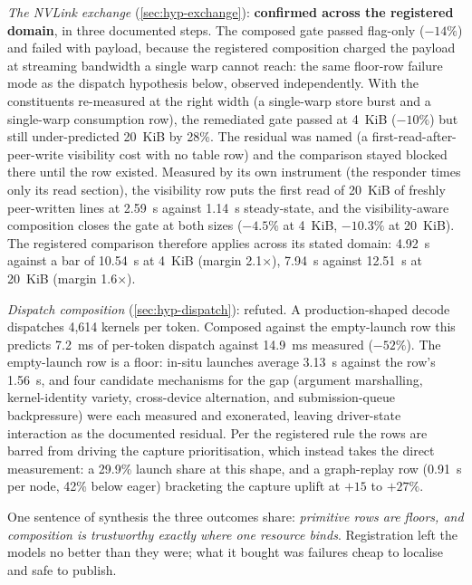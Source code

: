 \emph{The NVLink exchange} (\cref{sec:hyp-exchange}): \textbf{confirmed
across the registered domain}, in three documented steps. The composed
gate passed flag-only ($-14\%$) and failed with payload, because the
registered composition charged the payload at streaming bandwidth a
single warp cannot reach: the same floor-row failure mode as the
dispatch hypothesis below, observed independently. With the constituents
re-measured at the right width (a single-warp store burst and a
single-warp consumption row), the remediated gate passed at 4~KiB
($-10\%$) but still under-predicted 20~KiB by 28\%. The residual was
named (a first-read-after-peer-write visibility cost with no table
row) and the comparison stayed blocked there until the row existed.
Measured by its own instrument (the responder times only its read
section), the visibility row puts the first read of 20~KiB of freshly
peer-written lines at 2.59~\textmu s against 1.14~\textmu s
steady-state, and the
visibility-aware composition closes the gate at both sizes ($-4.5\%$ at
4~KiB, $-10.3\%$ at 20~KiB). The registered comparison therefore applies
across its stated domain: 4.92~\textmu s against a bar of
10.54~\textmu s at 4~KiB (margin 2.1$\times$), 7.94~\textmu s against
12.51~\textmu s at 20~KiB (margin 1.6$\times$).

\emph{Dispatch composition} (\cref{sec:hyp-dispatch}): refuted. A
production-shaped decode dispatches 4{,}614 kernels per token. Composed
against the empty-launch row this predicts 7.2~ms of per-token dispatch
against 14.9~ms measured ($-52\%$). The empty-launch row is a floor:
in-situ launches average 3.13~\textmu s against the row's
1.56~\textmu s, and four
candidate mechanisms for the gap (argument marshalling, kernel-identity
variety, cross-device alternation, and submission-queue backpressure)
were each measured and exonerated, leaving driver-state interaction as
the documented residual. Per the registered rule the rows are barred
from driving the capture prioritisation, which instead takes the direct
measurement: a 29.9\% launch share at this shape, and a graph-replay row
(0.91~\textmu s per node, 42\% below eager) bracketing the capture
uplift at $+15$ to $+27\%$.

One sentence of synthesis the three outcomes share: \emph{primitive rows
are floors, and composition is trustworthy exactly where one resource
binds}. Registration left the models no better than they were; what it
bought was failures cheap to localise and safe to publish.
